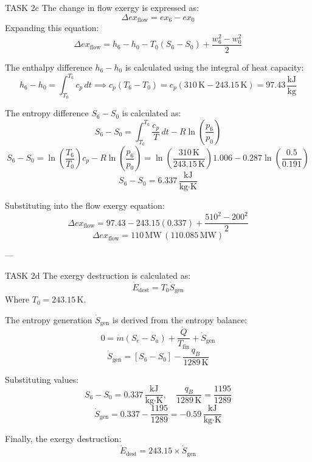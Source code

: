 TASK 2c  
The change in flow exergy is expressed as:  
\[
\Delta ex_{\text{flow}} = ex_{6} - ex_{0}
\]  
Expanding this equation:  
\[
\Delta ex_{\text{flow}} = h_6 - h_0 - T_0(S_6 - S_0) + \frac{w_6^2 - w_0^2}{2}
\]  

The enthalpy difference \( h_6 - h_0 \) is calculated using the integral of heat capacity:  
\[
h_6 - h_0 = \int_{T_0}^{T_6} c_p \, dt \implies c_p(T_6 - T_0) = c_p(310 \, \text{K} - 243.15 \, \text{K}) = 97.43 \, \frac{\text{kJ}}{\text{kg}}
\]  

The entropy difference \( S_6 - S_0 \) is calculated as:  
\[
S_6 - S_0 = \int_{T_0}^{T_6} \frac{c_p}{T} \, dt - R \ln \left( \frac{p_6}{p_0} \right)
\]  
\[
S_6 - S_0 = \ln \left( \frac{T_6}{T_0} \right) c_p - R \ln \left( \frac{p_6}{p_0} \right) = \ln \left( \frac{310 \, \text{K}}{243.15 \, \text{K}} \right) 1.006 - 0.287 \ln \left( \frac{0.5}{0.191} \right)
\]  
\[
S_6 - S_0 = 6.337 \, \frac{\text{kJ}}{\text{kg·K}}
\]  

Substituting into the flow exergy equation:  
\[
\Delta ex_{\text{flow}} = 97.43 - 243.15(0.337) + \frac{510^2 - 200^2}{2}
\]  
\[
\Delta ex_{\text{flow}} = 110 \, \text{MW} \, (110.085 \, \text{MW})
\]  

---

TASK 2d  
The exergy destruction is calculated as:  
\[
\dot{E}_{\text{dest}} = T_0 \dot{S}_{\text{gen}}
\]  
Where \( T_0 = 243.15 \, \text{K} \).  

The entropy generation \( \dot{S}_{\text{gen}} \) is derived from the entropy balance:  
\[
0 = \dot{m}(S_e - S_a) + \frac{\dot{Q}}{T_{\text{fin}}} + \dot{S}_{\text{gen}}
\]  
\[
\dot{S}_{\text{gen}} = [S_6 - S_0] - \frac{q_B}{1289 \, \text{K}}
\]  

Substituting values:  
\[
S_6 - S_0 = 0.337 \, \frac{\text{kJ}}{\text{kg·K}}, \quad \frac{q_B}{1289 \, \text{K}} = \frac{1195}{1289}
\]  
\[
\dot{S}_{\text{gen}} = 0.337 - \frac{1195}{1289} = -0.59 \, \frac{\text{kJ}}{\text{kg·K}}
\]  

Finally, the exergy destruction:  
\[
\dot{E}_{\text{dest}} = 243.15 \times \dot{S}_{\text{gen}}
\]  
